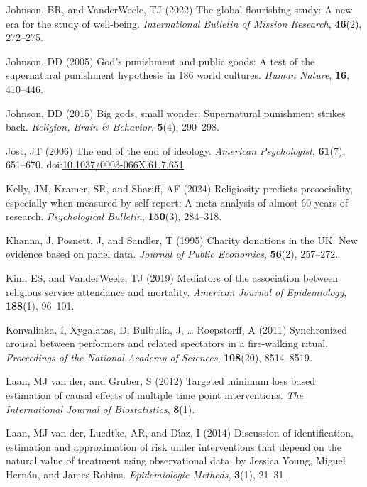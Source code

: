 \documentclass[
  single column]{article}
\newlength{\cslhangindent}
\newenvironment{CSLReferences}[2] %
 {\begin{list}{}{%
  \setlength{\itemindent}{0pt}
  \setlength{\leftmargin}{0pt}
  \setlength{\parsep}{0pt}
  \ifodd #1
   \setlength{\leftmargin}{\cslhangindent}
   \setlength{\itemindent}{-1\cslhangindent}
  \fi
  \setlength{\itemsep}{#2\baselineskip}}}
 {\end{list}}
\begin{document}
\begin{CSLReferences}{1}{0}
Johnson, BR, and VanderWeele, TJ (2022) The global flourishing study: A
new era for the study of well-being. \emph{International Bulletin of
Mission Research}, \textbf{46}(2), 272--275.

Johnson, DD (2005) God{'}s punishment and public goods: A test of the
supernatural punishment hypothesis in 186 world cultures. \emph{Human
Nature}, \textbf{16}, 410--446.

Johnson, DD (2015) Big gods, small wonder: Supernatural punishment
strikes back. \emph{Religion, Brain \& Behavior}, \textbf{5}(4),
290--298.

Jost, JT (2006) The end of the end of ideology. \emph{American
Psychologist}, \textbf{61}(7), 651--670.
doi:\href{https://doi.org/10.1037/0003-066X.61.7.651}{10.1037/0003-066X.61.7.651}.

Kelly, JM, Kramer, SR, and Shariff, AF (2024) Religiosity predicts
prosociality, especially when measured by self-report: A meta-analysis
of almost 60 years of research. \emph{Psychological Bulletin},
\textbf{150}(3), 284--318.

Khanna, J, Posnett, J, and Sandler, T (1995) Charity donations in the
UK: New evidence based on panel data. \emph{Journal of Public
Economics}, \textbf{56}(2), 257--272.

Kim, ES, and VanderWeele, TJ (2019) Mediators of the association between
religious service attendance and mortality. \emph{American Journal of
Epidemiology}, \textbf{188}(1), 96--101.

Konvalinka, I, Xygalatas, D, Bulbulia, J, \ldots{} Roepstorff, A (2011)
Synchronized arousal between performers and related spectators in a
fire-walking ritual. \emph{Proceedings of the National Academy of
Sciences}, \textbf{108}(20), 8514--8519.

Laan, MJ van der, and Gruber, S (2012) Targeted minimum loss based
estimation of causal effects of multiple time point interventions.
\emph{The International Journal of Biostatistics}, \textbf{8}(1).

Laan, MJ van der, Luedtke, AR, and Dı́az, I (2014) Discussion of
identification, estimation and approximation of risk under interventions
that depend on the natural value of treatment using observational data,
by {J}essica {Y}oung, {M}iguel {H}ern{á}n, and {J}ames {R}obins.
\emph{Epidemiologic Methods}, \textbf{3}(1), 21--31.


\end{CSLReferences}
\end{document}
